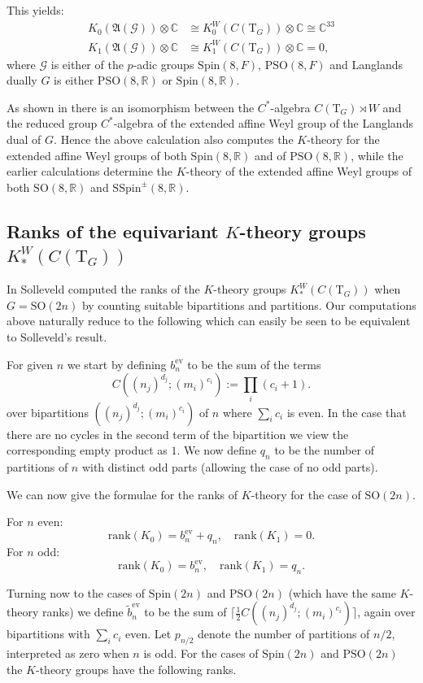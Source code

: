 \documentclass[11pt,a4paper]{article}
\def\SSpin{\mathrm{SSpin}}
\def\Spin{\mathrm{Spin}}
\def\SO{\mathrm{SO}}
\def\PSO{\mathrm{PSO}}
\def\SSpin{\mathrm{SSpin}}
\def\fA{\mathfrak{A}}
\def\R{\mathbb{R}}
\def\fA{\mathfrak{A}}
\def\ev{\mathrm{ev}}
\def\bT{\mathrm{T}}
\def\G{\mathcal{G}}
\def\rank{\mathrm{rank}}
\begin{document}
This yields:
\begin{align*}
K_0(\fA(\G))\otimes \mathbb C &\cong K_0^W(C(\bT_G))\otimes \mathbb C\cong \mathbb C^{33}\\
K_1(\fA(\G))\otimes \mathbb C &\cong K_1^W(C(\bT_G))\otimes \mathbb C= 0,
\end{align*}
where $\G$ is either of the $p$-adic groups $\Spin(8,F)$, $\PSO(8,F)$ and Langlands dually $G$ is either $\PSO(8,\R)$ or $\Spin(8,\R)$.

As shown in \cite{NPWKdual} there is an isomorphism between the $C^*$-algebra $C(\bT_G)\rtimes W$ and the reduced group $C^*$-algebra of the extended affine Weyl group of the Langlands dual of $G$.  Hence the above calculation also computes the $K$-theory for the extended affine Weyl groups of both $\Spin(8,\R)$ and of $\PSO(8,\R)$, while the earlier calculations determine the $K$-theory of the extended affine Weyl groups of both $\SO(8,\R)$ and $\SSpin^\pm(8,\R)$.


\subsection{Ranks of the equivariant $K$-theory groups $K_*^W(C(\bT_G))$}\label{K-theory ranks}

In \cite{Sol} Solleveld computed the ranks of the $K$-theory groups $K_*^W(C(\bT_G))$ when $G=\SO(2n)$ by counting suitable bipartitions and partitions. Our computations above naturally reduce to the following which can easily be seen to be equivalent to Solleveld's result.

For given $n$ we start by defining $b_n^\ev$ to be the sum of the terms 
\[
C((n_j)^{d_j};(m_i)^{c_i}):=\prod_i(c_i+1).
\]
over bipartitions $((n_j)^{d_j};(m_i)^{c_i})$ of $n$ where $\sum_i c_i$ is even. In the case that there are no cycles in the second term of the bipartition we view the corresponding empty product as $1$. We now define $q_n$ to be the number of partitions of $n$ with distinct odd parts (allowing the case of no odd parts).

We can now give the formulae for the ranks of $K$-theory for the case of $\SO(2n)$. 
\nopagebreak


\noindent For $n$ even:
\[
\rank(K_0)=b_n^\ev+q_n,\quad \rank(K_1)=0.
\]
For $n$ odd:
\[
\rank(K_0)=b_n^\ev,\quad \rank(K_1)=q_n.
\]

Turning now to the cases of $\Spin(2n)$ and $\PSO(2n)$ (which have the same $K$-theory ranks) we define $\tilde b_n^\ev$ to be the sum of $\lceil\frac 12 C((n_j)^{d_j};(m_i)^{c_i})\rceil$, again over bipartitions with $\sum_ic_i$ even. Let $p_{n/2}$ denote the number of partitions of $n/2$, interpreted as zero when $n$ is odd. For the cases of $\Spin(2n)$ and $\PSO(2n)$ the $K$-theory groups have the following ranks.
\end{document}

